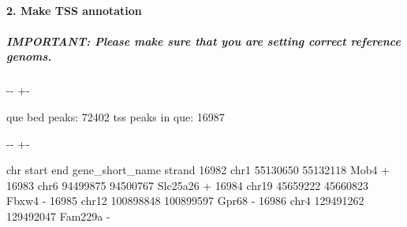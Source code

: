 \documentclass[letterpaper,10pt,english]{sphinxmanual}
\newlength\nbsphinxcodecellspacing
\begin{document}
\paragraph{2. Make TSS annotation}
\label{\detokenize{notebooks/01_ATAC-seq_data_processing/option1_scATAC-seq_data_analysis_with_cicero/02_preprocess_peak_data:2.-Make-TSS-annotation}}

\subparagraph{IMPORTANT: Please make sure that you are setting correct reference genoms.}
\label{\detokenize{notebooks/01_ATAC-seq_data_processing/option1_scATAC-seq_data_analysis_with_cicero/02_preprocess_peak_data:IMPORTANT:-Please-make-sure-that-you-are-setting-correct-reference-genoms.}}
{
\begin{sphinxVerbatim}[commandchars=\\\{\}]
\llap{\color{nbsphinxin}[5]:\,\hspace{\fboxrule}\hspace{\fboxsep}}   

\end{sphinxVerbatim}
}

{

\kern-\sphinxverbatimsmallskipamount\kern-\baselineskip
\kern+\FrameHeightAdjust\kern-\fboxrule
\vspace{\nbsphinxcodecellspacing}

\begin{sphinxVerbatim}[commandchars=\\\{\}]
que bed peaks: 72402
tss peaks in que: 16987
\end{sphinxVerbatim}
}

{

\kern-\sphinxverbatimsmallskipamount\kern-\baselineskip
\kern+\FrameHeightAdjust\kern-\fboxrule
\vspace{\nbsphinxcodecellspacing}

\begin{sphinxVerbatim}[commandchars=\\\{\}]
\llap{\color{nbsphinxout}[5]:\,\hspace{\fboxrule}\hspace{\fboxsep}}         chr      start        end gene\_short\_name strand
16982   chr1   55130650   55132118            Mob4      +
16983   chr6   94499875   94500767        Slc25a26      +
16984  chr19   45659222   45660823           Fbxw4      -
16985  chr12  100898848  100899597           Gpr68      -
16986   chr4  129491262  129492047         Fam229a      -
\end{sphinxVerbatim}
}
\end{document}
